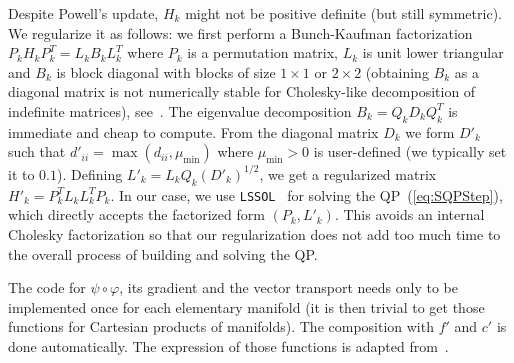 Despite Powell's update, $H_{k}$ might not be positive definite (but still symmetric). We regularize it as follows: we first perform a Bunch-Kaufman factorization $P_k H_k P_k^T= L_k B_k L_k^T$ where $P_k$ is a permutation matrix, $L_k$ is unit lower triangular and $B_k$ is block diagonal with blocks of size $1 \times 1$ or $2\times 2$ (obtaining $B_k$ as a diagonal matrix is not numerically stable for Cholesky-like decomposition of indefinite matrices), see~\cite{golub:book:1996}.
The eigenvalue decomposition $B_k = Q_k D_k Q_k^T$ is immediate and cheap to compute. From the diagonal matrix $D_k$ we form $D'_k$ such that $d'_{ii} = \max\left(d_{ii},\mu_{\min}\right)$ where $\mu_{\min}>0$ is user-defined (we typically set it to $0.1$).
Defining $L'_k = L_k Q_k (D'_k)^{1/2}$, we get a regularized matrix $H'_k = P_k^T L_k L_k^T P_k$. In our case, we use {\tt LSSOL}~\cite{gill:techrep:1986} for solving the QP~(\ref{eq:SQPStep}), which directly accepts the factorized form $(P_k, L'_k)$. This avoids an internal Cholesky factorization so that our regularization does not add too much time to the overall process of building and solving the QP.

The code for $\psi\circ\varphi$, its gradient and the vector transport needs only to be implemented once for each elementary manifold (it is then trivial to get those functions for Cartesian products of manifolds). The composition with $f'$ and $c'$ is done automatically. The expression of those functions is adapted from~\cite{boumal:jmlr:2014}.


